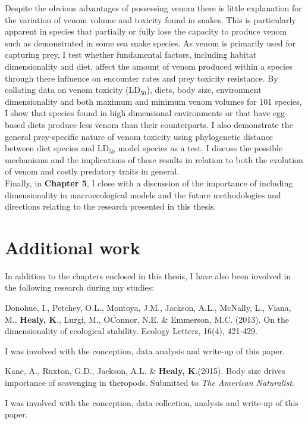 Despite the obvious advantages of possessing venom there is little explanation for the variation of venom volume and toxicity found in snakes. This is particularly apparent in species that partially or fully lose the capacity to produce venom such as demonstrated in some sea snake species. As venom is primarily used for capturing prey, I test whether fundamental factors, including habitat dimensionality and diet, affect the amount of venom produced within a species through there influence on encounter rates and prey toxicity resistance. By collating data on venom toxicity (LD$_{50}$), diets, body size, environment dimensionality and both maximum and minimum venom volumes for 101 species, I show that species found in high dimensional environments or that have egg-based diets produce less venom than their counterparts. I also demonstrate the general prey-specific nature of venom toxicity using phylogenetic distance between diet species and LD$_{50}$ model species as a test. I discuss the possible mechanisms and the implications of these results in relation to both the evolution of venom and costly predatory traits in general.\\

%
%
Finally, in \textbf{Chapter 5}, I close with a discussion of the importance of including dimensionality in macroecological models and the future methodologies and directions relating to the research presented in this thesis.


\section{\uppercase{A}dditional work}
In addition to the chapters enclosed in this thesis, I have also been involved in the following research during my studies:\\

\begin{singlespace}
Donohue, I., Petchey, O.L., Montoya, J.M., Jackson, A.L., McNally, L., Viana, M., \textbf{Healy, K}., Lurgi, M., O\'Connor, N.E. \& Emmerson, M.C. (2013). On the dimensionality of ecological stability. Ecology Letters, 16(4), 421-429. \\
\end{singlespace}

\noindent
I was involved with the conception, data analysis and write-up of this paper. \\

\begin{singlespace}
Kane, A., Ruxton, G.D., Jackson, A.L. \& \textbf{Healy, K}.(2015). Body size drives importance of scavenging in theropods. Submitted to \textit{The American Naturalist}. \\
\end{singlespace}

\noindent
I was involved with the conception, data collection, analysis and write-up of this paper. \\



%
%

